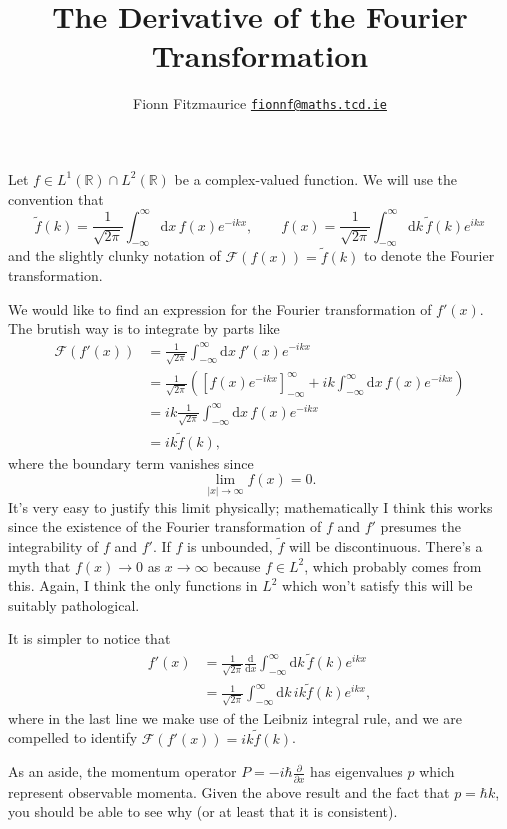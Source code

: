 \documentclass[11pt, a4paper]{article}
\title{The Derivative of the Fourier Transformation}
\author{Fionn Fitzmaurice \hspace{20pt} \normalsize{\href{mailto:fionnf@maths.tcd.ie}{\texttt{fionnf@maths.tcd.ie}}}}
\date{}
\renewcommand{\d}{\ensuremath{\mathrm{d}}}
\begin{document}
\maketitle
\thispagestyle{empty}

\noindent Let $f \in L^{\!1}(\mathbb{R}) \cap L^{\!2}(\mathbb{R})$ be a complex-valued function. We will use the convention that
\[
\tilde{f}(k) = \frac{1}{\sqrt{2\pi}} \int_{-\infty}^\infty \! \d x\, f(x) e^{-ikx},\qquad f(x) = \frac{1}{\sqrt{2\pi}} \int_{-\infty}^\infty \! \d k\, \tilde{f}(k) e^{ikx}
\]
and the slightly clunky notation of $\mathcal{F}(f(x)) = \tilde{f}(k)$ to denote the Fourier transformation.

We would like to find an expression for the Fourier transformation of $f'(x)$. The brutish way is to integrate by parts like
\begin{align*}
\mathcal{F}(f'(x)) &= \frac{1}{\sqrt{2\pi}} \int_{-\infty}^\infty \! \d x \, f'(x) e^{-ikx} \\
&= \frac{1}{\sqrt{2\pi}} \left( \left[ f(x) e^{-ikx} \right]_{-\infty}^\infty + ik \! \int_{-\infty}^\infty \! \d x\, f(x) e^{-ikx}  \right) \\
&= ik \frac{1}{\sqrt{2\pi}} \int_{-\infty}^\infty \! \d x \, f(x) e^{-ikx} \\
&= ik \tilde{f}(k),
\end{align*}
where the boundary term vanishes since
\[
\lim_{|x| \to \infty} f(x) = 0.
\]
It's very easy to justify this limit physically; mathematically I think this works since the existence of the Fourier transformation of $f$ and $f'$ presumes the integrability of $f$ and $f'$. If $f$ is unbounded, $\tilde{f}$ will be discontinuous. There's a myth that $f(x) \to 0$ as $x \to \infty$ because $f \in L^{\!2}$, which probably comes from this. Again, I think the only functions in $L^{\!2}$ which won't satisfy this will be suitably pathological.

It is simpler to notice that
\begin{align*}
f'(x) &= \frac{1}{\sqrt{2\pi}} \frac{\d}{\d x} \int_{-\infty}^\infty \! \d k \, \tilde{f}(k) e^{ikx} \\
&= \frac{1}{\sqrt{2\pi}} \int_{-\infty}^\infty \! \d k \, ik \tilde{f}(k) e^{ikx},
\end{align*}
where in the last line we make use of the Leibniz integral rule, and we are compelled to identify $\mathcal{F}(f'(x)) = ik \tilde{f}(k)$.

As an aside, the momentum operator $P = -i\hbar \frac{\partial}{\partial x}$ has eigenvalues $p$ which represent observable momenta. Given the above result and the fact that $p = \hbar k$, you should be able to see why (or at least that it is consistent).
\end{document}
